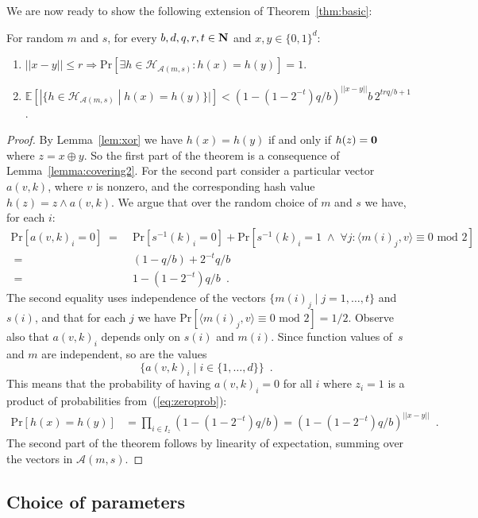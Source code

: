 \documentclass[prodmode,acmtalg]{acmsmall}
\newcommand{\E}[1]{\mathbb{E}\left[#1\right]}
\renewcommand{\Pr}[1]{\text{Pr}\left[#1\right]}
\begin{document}
We are now ready to show the following extension of Theorem~\ref{thm:basic}:
\begin{theorem}\label{thm:main}
	For random $m$ and $s$, for every $b,d,q,r,t\in {\bf N}$ and $x,y\in \{0,1\}^d$:
	\begin{enumerate}
\item $||x-y|| \leq r \Rightarrow \Pr{\exists h\in \mathcal{H}_{\mathcal{A}(m,s)}: h(x)=h(y)} = 1$.
\item $\E{ | \{ h\in \mathcal{H}_{\mathcal{A}(m,s)} \;|\; h(x)=h(y) \} | }
	< \left(1 - (1-2^{-t}) q/b \right) ^ {||x-y||} b\, 2^{trq/b+1}$.
\end{enumerate}
\end{theorem}
\begin{proof}
    By Lemma~\ref{lem:xor} we have $h(x)=h(y)$ if and only if $h(z)={\bf 0}$ where $z = x \oplus y$.
	So the first part of the theorem is a consequence of Lemma~\ref{lemma:covering2}.
	For the second part consider a particular vector $a(v,k)$, where $v$ is nonzero, and the corresponding hash value $h(z) = z \wedge a(v,k)$.
	We argue that over the random choice of $m$ and $s$ we have, for each $i$:
\begin{align}\label{eq:zeroprob}
	\Pr{ a(v,k)_i = 0 }  \;=\; & \Pr{ s^{-1}(k)_i = 0 } + \Pr{s^{-1}(k)_i = 1  \; \wedge \; \forall j: \langle m(i)_j,v\rangle \equiv 0 \text{ mod } 2} \nonumber \\
	\;=\; & (1-q/b) + 2^{-t} q/b \\
	\;=\; & 1 - (1-2^{-t})q/b \nonumber \enspace .
	\end{align}
The second equality uses independence of the vectors $\{ m(i)_j \; | \; j=1,\dots,t\}$ and $s(i)$, and that for each $j$ we have $\Pr{\langle m(i)_j,v\rangle \equiv 0 \text{ mod }2} = 1/2$.
	Observe also that $a(v,k)_i$ depends only on $s(i)$ and $m(i)$.
	Since function values of~$s$ and $m$ are independent, so are the values 
$$\{ a(v,k)_i \; | \; i\in\{1,\dots,d\}\} \enspace .$$
This means that the probability of having $a(v,k)_i = 0$ for all $i$ where $z_i=1$ is a product of probabilities from~(\ref{eq:zeroprob}):
\begin{align*}
	\Pr{h(x)=h(y)} & = \prod_{i\in I_z} \left(1 - (1-2^{-t})q/b\right)
 	=\left(1 - (1-2^{-t}) q/b \right)^{||x-y||} \enspace .
 \end{align*}
The second part of the theorem follows by linearity of expectation, summing over the 
vectors in $\mathcal{A}(m,s)$. 
\end{proof}


\subsection{Choice of parameters}
\end{document}
